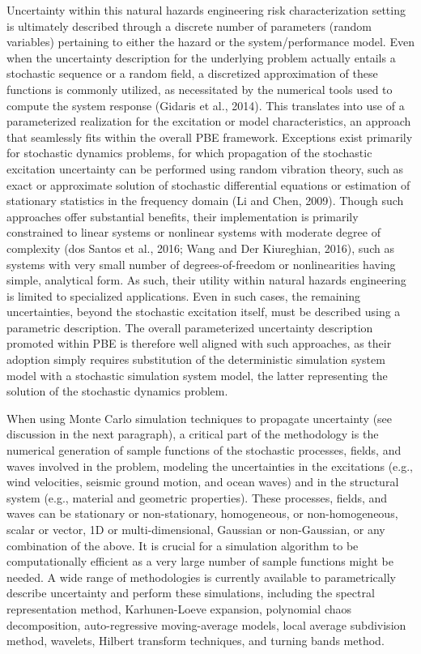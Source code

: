 Uncertainty within this natural hazards engineering risk characterization setting is ultimately described through a discrete number of parameters (random variables) pertaining to either the hazard or the system/performance model. Even when the uncertainty description for the underlying problem actually entails a stochastic sequence or a random field, a discretized approximation of these functions is commonly utilized, as necessitated by the numerical tools used to compute the system response (Gidaris et al., 2014). This translates into use of a parameterized realization for the excitation or model characteristics, an approach that seamlessly fits within the overall PBE framework. Exceptions exist primarily for stochastic dynamics problems, for which propagation of the stochastic excitation uncertainty can be performed using random vibration theory, such as exact or approximate solution of stochastic differential equations or estimation of stationary statistics in the frequency domain (Li and Chen, 2009). Though such approaches offer substantial benefits, their implementation is primarily constrained to linear systems or nonlinear systems with moderate degree of complexity (dos Santos et al., 2016; Wang and Der Kiureghian, 2016), such as systems with very small number of degrees-of-freedom or nonlinearities having simple, analytical form. As such, their utility within natural hazards engineering is limited to specialized applications. Even in such cases, the remaining uncertainties, beyond the stochastic excitation itself, must be described using a parametric description. The overall parameterized uncertainty description promoted within PBE is therefore well aligned with such approaches, as their adoption simply requires substitution of the deterministic simulation system model with a stochastic simulation system model, the latter representing the solution of the stochastic dynamics problem.

When using Monte Carlo simulation techniques to propagate uncertainty (see discussion in the next paragraph), a critical part of the methodology is the numerical generation of sample functions of the stochastic processes, fields, and waves involved in the problem, modeling the uncertainties in the excitations (e.g., wind velocities, seismic ground motion, and ocean waves) and in the structural system (e.g., material and geometric properties). These processes, fields, and waves can be stationary or non-stationary, homogeneous, or non-homogeneous, scalar or vector, 1D or multi-dimensional, Gaussian or non-Gaussian, or any combination of the above. It is crucial for a simulation algorithm to be computationally efficient as a very large number of sample functions might be needed. A wide range of methodologies is currently available to parametrically describe uncertainty and perform these simulations, including the spectral representation method, Karhunen-Loeve expansion, polynomial chaos decomposition, auto-regressive moving-average models, local average subdivision method, wavelets, Hilbert transform techniques, and turning bands method.

